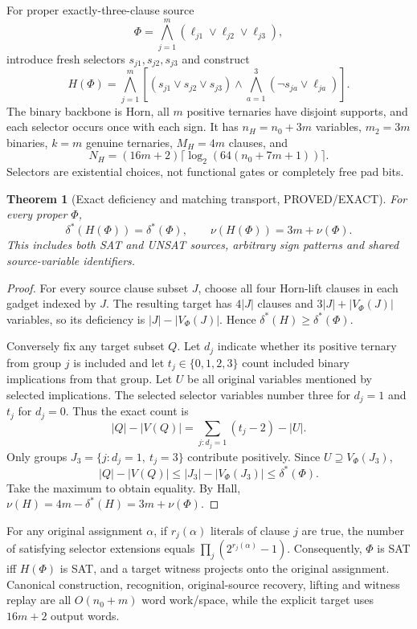 \documentclass[11pt]{article}
\newtheorem{theorem}{Theorem}
\begin{document}
For proper exactly-three-clause source
\[
\Phi=\bigwedge_{j=1}^m(\ell_{j1}\vee\ell_{j2}\vee\ell_{j3}),
\]
introduce fresh selectors $s_{j1},s_{j2},s_{j3}$ and construct
\[
H(\Phi)=\bigwedge_{j=1}^m
\left[(s_{j1}\vee s_{j2}\vee s_{j3})
\wedge\bigwedge_{a=1}^3(\neg s_{ja}\vee\ell_{ja})\right].
\]
The binary backbone is Horn, all $m$ positive ternaries have disjoint supports, and each selector occurs once with each sign. It has $n_H=n_0+3m$ variables, $m_2=3m$ binaries, $k=m$ genuine ternaries, $M_H=4m$ clauses, and
\[
N_H=(16m+2)\lceil\log_2(64(n_0+7m+1))\rceil.
\]
Selectors are existential choices, not functional gates or completely free pad bits.

\begin{theorem}[Exact deficiency and matching transport, PROVED/EXACT]
For every proper $\Phi$,
\[
\boxed{\delta^*(H(\Phi))=\delta^*(\Phi)},\qquad
\boxed{\nu(H(\Phi))=3m+\nu(\Phi)}.
\]
This includes both SAT and UNSAT sources, arbitrary sign patterns and shared source-variable identifiers.
\end{theorem}
\begin{proof}
For every source clause subset $J$, choose all four Horn-lift clauses in each gadget indexed by $J$. The resulting target has $4|J|$ clauses and $3|J|+|V_\Phi(J)|$ variables, so its deficiency is $|J|-|V_\Phi(J)|$. Hence $\delta^*(H)\ge\delta^*(\Phi)$.

Conversely fix any target subset $Q$. Let $d_j$ indicate whether its positive ternary from group $j$ is included and let $t_j\in\{0,1,2,3\}$ count included binary implications from that group. Let $U$ be all original variables mentioned by selected implications. The selected selector variables number three for $d_j=1$ and $t_j$ for $d_j=0$. Thus the exact count is
\[
|Q|-|V(Q)|=\sum_{j:d_j=1}(t_j-2)-|U|.
\]
Only groups $J_3=\{j:d_j=1,\ t_j=3\}$ contribute positively. Since $U\supseteq V_\Phi(J_3)$,
\[
|Q|-|V(Q)|\le |J_3|-|V_\Phi(J_3)|\le\delta^*(\Phi).
\]
Take the maximum to obtain equality. By Hall, $\nu(H)=4m-\delta^*(H)=3m+\nu(\Phi)$.
\end{proof}
For any original assignment $\alpha$, if $r_j(\alpha)$ literals of clause $j$ are true, the number of satisfying selector extensions equals $\prod_j(2^{r_j(\alpha)}-1)$. Consequently, $\Phi$ is SAT iff $H(\Phi)$ is SAT, and a target witness projects onto the original assignment. Canonical construction, recognition, original-source recovery, lifting and witness replay are all $O(n_0+m)$ word work/space, while the explicit target uses $16m+2$ output words.
\end{document}
